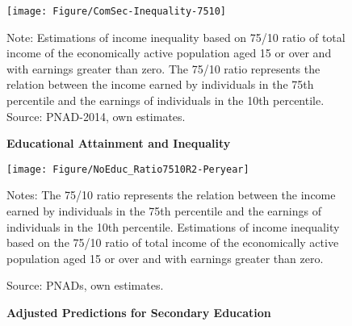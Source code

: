 \documentclass[a4paper, 12pt]{article}
\begin{document}
\begin{figure}[htb]
\centering
\texttt{[image: Figure/ComSec-Inequality-7510]}
\begin{minipage}{0.87\textwidth} %
{\scriptsize
Note: Estimations of income inequality based on 75/10 ratio of total income of the economically active population aged 15 or over  and with earnings greater than zero. The 75/10 ratio represents the relation between the income earned by individuals in the 75th percentile and the earnings of individuals in the 10th percentile. \\
Source: PNAD-2014, own estimates.\par}
\end{minipage}
\captionsetup{justification=centering,margin=2cm}
\caption{\textbf{Educational Attainment and Inequality}}
\label{fig:Drop-Income}
\end{figure}





\newpage
\begin{figure}[htb]
\centering
\texttt{[image: Figure/NoEduc\_Ratio7510R2-Peryear]}
\begin{minipage}{0.87\textwidth} %
{\scriptsize
Notes: The 75/10 ratio represents the relation between the income earned by individuals in the 75th percentile and the earnings of individuals in the 10th percentile. Estimations of income inequality based on the 75/10 ratio of total income of the economically active population aged 15 or over and with earnings greater than zero.

Source: PNADs, own estimates.\par}
\end{minipage}
\captionsetup{justification=centering,margin=2cm}
\caption{\textbf{Adjusted Predictions for Secondary Education}}
\label{fig-NoEduc_Ratio7510R2-Peryear}
\end{figure}
\end{document}

